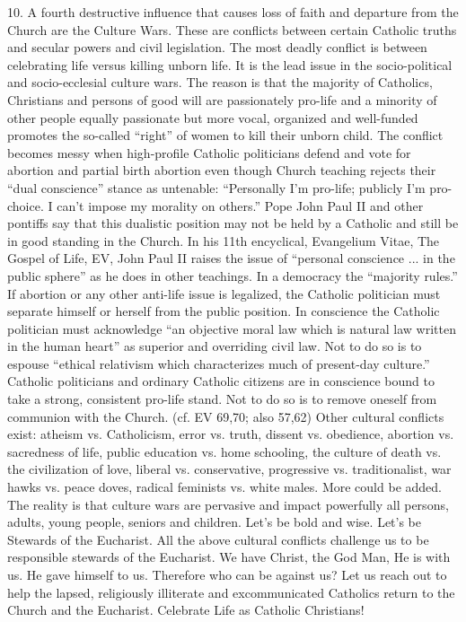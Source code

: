 \documentclass[oneside]{book}
\begin{document}
10. A fourth destructive influence that causes loss of faith and departure from
the Church are the Culture Wars. These are conflicts between certain Catholic
truths and secular powers and civil legislation. The most deadly conflict is
between celebrating life versus killing unborn life. It is the lead issue in the
socio-political and socio-ecclesial culture wars. The reason is that the
majority of Catholics, Christians and persons of good will are passionately
pro-life and a minority of other people equally passionate but more vocal,
organized and well-funded promotes the so-called ``right'' of women to kill
their unborn child. The conflict becomes messy when high-profile Catholic
politicians defend and vote for abortion and partial birth abortion even though
Church teaching rejects their ``dual conscience'' stance as untenable:
``Personally I'm pro-life; publicly I'm pro-choice. I can't impose my morality
on others.''
Pope John Paul II and other pontiffs say that this dualistic position may not be
held by a Catholic and still be in good standing in the Church. In his 11th
encyclical, Evangelium Vitae, The Gospel of Life, EV, John Paul II raises the
issue of ``personal conscience ... in the public sphere'' as he does in other
teachings. In a democracy the ``majority rules.'' If abortion or any other
anti-life issue is legalized, the Catholic politician must separate himself or
herself from the public position. In conscience the Catholic politician must
acknowledge ``an objective moral law which is natural law written in the human
heart'' as superior and overriding civil law. Not to do so is to espouse
``ethical relativism which characterizes much of present-day culture.'' Catholic
politicians and ordinary Catholic citizens are in conscience bound to take a
strong, consistent pro-life stand. Not to do so is to remove oneself from
communion with the Church. (cf. EV 69,70; also 57,62)
Other cultural conflicts exist: atheism vs. Catholicism, error vs. truth,
dissent vs. obedience, abortion vs. sacredness of life, public education
vs. home schooling, the culture of death vs. the civilization of love, liberal
vs. conservative, progressive vs. traditionalist, war hawks vs. peace doves,
radical feminists vs. white males. More could be added. The reality is that
culture wars are pervasive and impact powerfully all persons, adults, young
people, seniors and children. Let's be bold and wise. Let's be Stewards of the
Eucharist. All the above cultural conflicts challenge us to be responsible
stewards of the Eucharist. We have Christ, the God Man, He is with us. He gave
himself to us. Therefore who can be against us? Let us reach out to help the
lapsed, religiously illiterate and excommunicated Catholics return to the Church
and the Eucharist. Celebrate Life as Catholic Christians!
\end{document}

